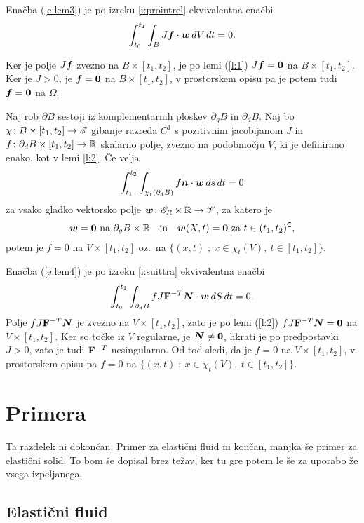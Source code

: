 \proof
	Enačba (\ref{e:lem3}) je po izreku \ref{i:prointrel} ekvivalentna enačbi
	\[ \int_{t_0}^{t_1}\int_{B}J\boldsymbol f\cdot \boldsymbol w \,dV\,dt=0. \]
	
	Ker je polje $J\boldsymbol f$ zvezno na $B\times[t_1,t_2]$, je
	po lemi (\ref{l:1}) $J\boldsymbol f=\boldsymbol 0$
	na $B\times[t_1,t_2]$. Ker je $J>0$, je $\boldsymbol f=\boldsymbol 0$ na $B\times[t_1,t_2]$,
	v prostorskem opisu pa je potem tudi $\boldsymbol f=\boldsymbol 0$ na $\Omega$.
\endproof

\begin{lema}
	Naj rob $\partial B$ sestoji iz komplementarnih ploskev $\partial_g B$ in $\partial_d B$.
	Naj bo $\chi\colon B\times[t_1,t_2]\to\mathscr E$ gibanje razreda $C^1$ s pozitivnim jacobijanom $J$ in
	$f\colon\partial_d B\times[t_1,t_2]\to\mathbb R$ skalarno polje, zvezno na podobmočju $V$, ki je definirano
	enako, kot v lemi \ref{l:2}.
	Če velja
	\begin{equation}\label{e:lem4}
		\int_{t_1}^{t_2}\int_{\chi_t(\partial_d B)}f\boldsymbol n\cdot\boldsymbol w\,ds\,dt=0
	\end{equation}
	za vsako gladko vektorsko polje $\boldsymbol w\colon\mathscr E_R\times\mathbb R\to\mathscr V$, za katero je
	\[
		\vek{w}=\vek{0}\ \textrm{na}\ \partial_g B\times \R\quad\textrm{in}\quad
		\vek{w}(X,t)=\vek{0}\ \textrm{za}\ t\in(t_1,t_2)^{\mathsf C},
	\]
	potem je $f=0$ na $V\times[t_1,t_2]$ oz.~na $\{(x,t)\;;\ x\in\chi_t(V),\ t\in[t_1,t_2] \}$.
\end{lema}

\proof
	Enačba (\ref{e:lem4}) je po izreku \ref{i:suittra} ekvivalentna enačbi
	\[ \int_{t_0}^{t_1}\int_{\partial_d B}fJ\mathbf F^{-T}\boldsymbol N\cdot\boldsymbol w\,dS\,dt=0. \]
	Polje $fJ\mathbf F^{-T}\boldsymbol N$ je zvezno na $V\times[t_1,t_2]$,
	zato je po lemi (\ref{l:2}) $fJ\mathbf F^{-T}\boldsymbol N=\boldsymbol 0$ na $V\times[t_1,t_2]$.
	Ker so točke iz $V$ regularne, je $\boldsymbol N\neq \boldsymbol 0$, hkrati je po predpostavki $J>0$,
	zato je tudi $\mathbf F^{-T}$ nesingularno. Od tod sledi, da je $f=0$ na $V\times[t_1,t_2]$,
	v prostorskem opisu pa $f=0$ na $\{(x,t)\;;\ x\in\chi_t(V),\ t\in[t_1,t_2] \}$.
\endproof


\section{Primera}


\textcolor[rgb]{1,0,0}{Ta razdelek ni dokončan. Primer za elastični fluid ni končan,
manjka še primer za elastični solid. To bom še dopisal brez težav, ker tu gre
potem le še za uporabo že vsega izpeljanega.}

\subsection{Elastični fluid}


